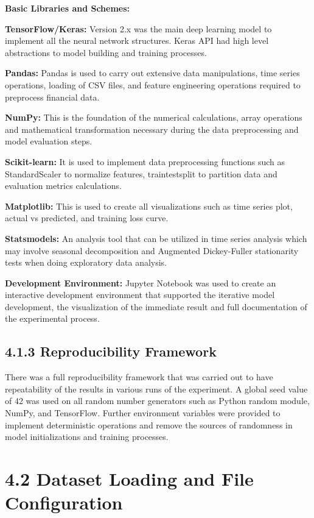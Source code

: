 \documentclass[12pt,a4paper]{report}
\begin{document}
\textbf{Basic Libraries and Schemes:}

\textbf{TensorFlow/}\textbf{Keras}\textbf{:} Version 2.x was the main deep learning model to implement all the neural network structures. Keras API had high level abstractions to model building and training processes.

\textbf{Pandas:} Pandas is used to carry out extensive data manipulations, time series operations, loading of CSV files, and feature engineering operations required to preprocess financial data.

\textbf{NumPy:} This is the foundation of the numerical calculations, array operations and mathematical transformation necessary during the data preprocessing and model evaluation steps.

\textbf{Scikit-learn:} It is used to implement data preprocessing functions such as StandardScaler to normalize features, traintestsplit to partition data and evaluation metrics calculations.

\textbf{Matplotlib:} This is used to create all visualizations such as time series plot, actual vs predicted, and training loss curve.

\textbf{Statsmodels}\textbf{:} An analysis tool that can be utilized in time series analysis which may involve seasonal decomposition and Augmented Dickey-Fuller stationarity tests when doing exploratory data analysis.

\textbf{Development Environment:} Jupyter Notebook was used to create an interactive development environment that supported the iterative model development, the visualization of the immediate result and full documentation of the experimental process.

\subsection{4.1.3 Reproducibility Framework}
There was a full reproducibility framework that was carried out to have repeatability of the results in various runs of the experiment. A global seed value of 42 was used on all random number generators such as Python random module, NumPy, and TensorFlow. Further environment variables were provided to implement deterministic operations and remove the sources of randomness in model initializations and training processes.

\section{4.2 Dataset Loading and File Configuration}
\end{document}
